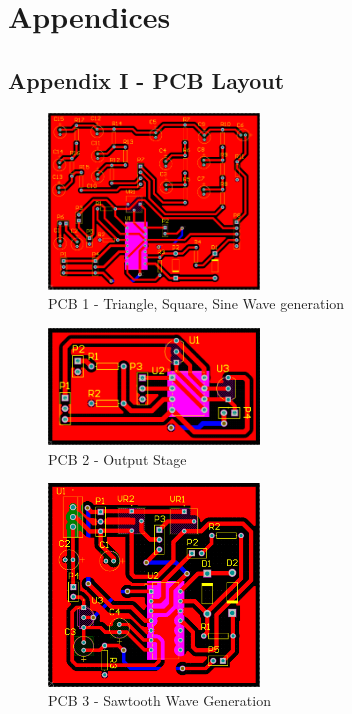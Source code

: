 \documentclass[11pt]{article}
\begin{document}
\newpage

\section{Appendices}

\subsection{Appendix I - PCB Layout}


\begin{multicols}{2}
\begin{figure}[H]
    \centering
    \includegraphics[width=0.5\textwidth]{pcb1_layout.PNG}
    \caption{PCB 1 - Triangle, Square, Sine Wave generation}
    \label{fig:mesh6}
\end{figure}

\begin{figure}[H]
    \centering
    \includegraphics[width=0.5\textwidth]{pcb2_layout.PNG}
    \caption{PCB 2 - Output Stage }
    \label{fig:mesh6}
\end{figure}

\begin{figure}[H]
    \centering
    \includegraphics[width=0.5\textwidth]{pcb3_layout.PNG}
    \caption{PCB 3 - Sawtooth Wave Generation}
    \label{fig:mesh6}
\end{figure}

\end{multicols}
\end{document}
